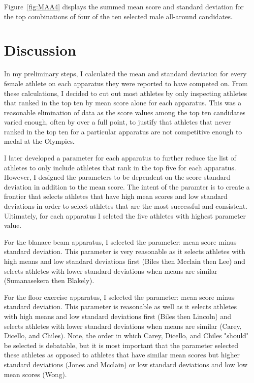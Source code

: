 \documentclass[12pt]{article}
\begin{document}
  Figure~\ref{fig:MAA4} displays the summed mean score and standard deviation 
  for the top combinations of four of the ten selected male all-around candidates.

\section{Discussion}
\label{sec:dis}

In my preliminary steps, I calculated the mean and standard deviation for every female athlete on each 
apparatus they were reported to have competed on. From these calculations, I decided to cut out most athletes 
by only inspecting athletes that ranked in the top ten by mean score alone for each apparatus. This was a 
reasonable elimination of data as the score values among the top ten candidates varied enough, often by over a 
full point, to justify that athletes that never ranked in the top ten for a particular apparatus are not 
competitive enough to medal at the Olympics.

I later developed a parameter for each apparatus to further reduce the list of athletes to only include athletes 
that rank in the top five for each apparatus. However, I designed the parameters to be dependent on the score 
standard deviation in addition to the mean score. The intent of the paramter is to create a frontier that selects 
athletes that have high mean scores and low standard deviations in order to select athletes that are the most 
successful and consistent. Ultimately, for each apparatus I selcted the five athletes with highest parameter value.

For the blanace beam apparatus, I selected the parameter: mean score minus standard deviation. This parameter 
is very reasonable as it selects athletes with high means and low standard deviations first (Biles then Mcclain 
then Lee) and selects athletes with lower standard deviations when means are similar (Sumanasekera then Blakely).

For the floor exercise apparatus, I selected the parameter: mean score minus standard deviation. This parameter 
is reasonable as well as it selects athletes with high means and low standard deviations first (Biles then Lincoln) 
and selects athletes with lower standard deviations when means are similar (Carey, Dicello, and Chiles). Note, the 
order in which Carey, Dicello, and Chiles "should" be selected is debatable, but it is most important that the 
parameter selected these athletes as opposed to athletes that have similar mean scores but higher standard deviations 
(Jones and Mcclain) or low standard deviations and low low mean scores (Wong).
\end{document}
